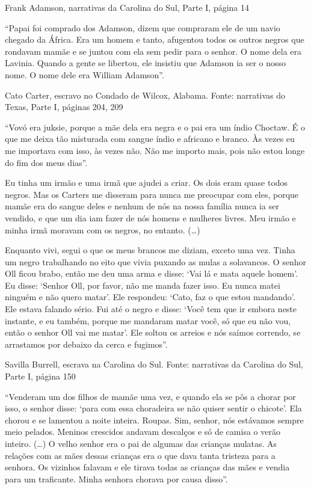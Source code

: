 Frank Adamson, narrativas da Carolina do Sul, Parte I, página 14

``Papai foi comprado dos Adamson, dizem que compraram ele de um navio
chegado da África. Era um homem e tanto, afugentou todos os outros
negros que rondavam mamãe e se juntou com ela sem pedir para o senhor. O
nome dela era Lavinia. Quando a gente se libertou, ele insistiu que
Adamson ia ser o nosso nome. O nome dele era William Adamson''.

Cato Carter, escravo no Condado de Wilcox, Alabama. Fonte: narrativas do
Texas, Parte I, páginas 204, 209

``Vovó era juksie, porque a mãe dela era negra e o pai era um índio
Choctaw. É o que me deixa tão misturada com sangue índio e africano e
branco. Às vezes eu me importava com isso, às vezes não. Não me importo
mais, pois não estou longe do fim dos meus dias''.

Eu tinha um irmão e uma irmã que ajudei a criar. Os dois eram quase
todos negros. Mas os Carters me disseram para nunca me preocupar com
eles, porque mamãe era do sangue deles e nenhum de nós na nossa família
nunca ia ser vendido, e que um dia iam fazer de nós homens e mulheres
livres. Meu irmão e minha irmã moravam com os negros, no entanto.
(\ldots{})

Enquanto vivi, segui o que os meus brancos me diziam, exceto uma vez.
Tinha um negro trabalhando no eito que vivia puxando as mulas a
solavancos. O senhor Oll ficou brabo, então me deu uma arma e disse:
`Vai lá e mata aquele homem'. Eu disse: `Senhor Oll, por favor, não me
manda fazer isso. Eu nunca matei ninguém e não quero matar'. Ele
respondeu: `Cato, faz o que estou mandando'. Ele estava falando sério.
Fui até o negro e disse: `Você tem que ir embora neste instante, e eu
também, porque me mandaram matar você, só que eu não vou, então o senhor
Oll vai me matar'. Ele soltou os arreios e nós saímos correndo, se
arrastamos por debaixo da cerca e fugimos''.

Savilla Burrell, escrava na Carolina do Sul. Fonte: narrativas da
Carolina do Sul, Parte I, página 150

``Venderam um dos filhos de mamãe uma vez, e quando ela se pôs a chorar
por isso, o senhor disse: `para com essa choradeira se não quiser sentir
o chicote'. Ela chorou e se lamentou a noite inteira. Roupas. Sim,
senhor, nós estávamos sempre meio pelados. Meninos crescidos andavam
descalços e só de camisa o verão inteiro. (\ldots{}) O velho senhor era
o pai de algumas das crianças mulatas. As relações com as mães dessas
crianças era o que dava tanta tristeza para a senhora. Os vizinhos
falavam e ele tirava todas as crianças das mães e vendia para um
traficante. Minha senhora chorava por causa disso''.

